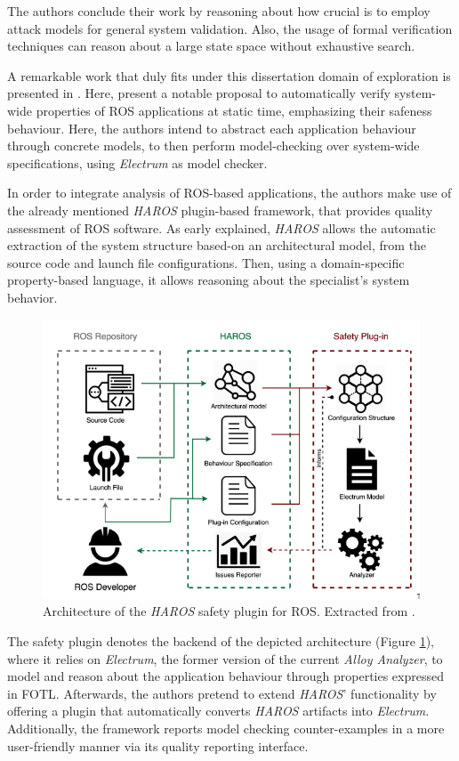 The authors conclude their work by reasoning about how crucial is to employ attack models for general system validation. Also, the usage of formal verification techniques can reason about a large state space without exhaustive search.

A remarkable work that duly fits under this dissertation domain of exploration is presented in . Here, \citeauthor{9341085} present a notable proposal to automatically verify system-wide properties of ROS applications at static time, emphasizing their safeness behaviour. Here, the authors intend to abstract each application behaviour through concrete models, to then perform model-checking over system-wide specifications, using \textit{Electrum} as model checker. 

In order to integrate analysis of ROS-based applications, the authors make use of the already mentioned \textit{HAROS} plugin-based framework, that provides quality assessment of ROS software. As early explained, \textit{HAROS} allows the automatic extraction of the system structure based-on an architectural model, from the source code and launch file configurations. Then, using a domain-specific property-based language, it allows reasoning about the specialist's system behavior. 

\begin{figure}[H]
    \centering
    \includegraphics[width=0.6\linewidth]{img/haros-electrum-plugin.png}
    \caption{Architecture of the \textit{HAROS} safety plugin for ROS. Extracted from \cite{9341085}.}
    \label{fig:haros-electrum}
\end{figure}

The safety plugin denotes the backend of the depicted architecture (Figure \ref{fig:haros-electrum}), where it relies on \textit{Electrum}, the former version of the current \textit{Alloy Analyzer}, to model and reason about the application behaviour through properties expressed in FOTL. Afterwards, the authors pretend to extend \textit{HAROS}' functionality by offering a plugin that automatically converts \textit{HAROS} artifacts into \textit{Electrum}. Additionally, the framework reports model checking counter-examples in a more user-friendly manner via its quality reporting interface. 

